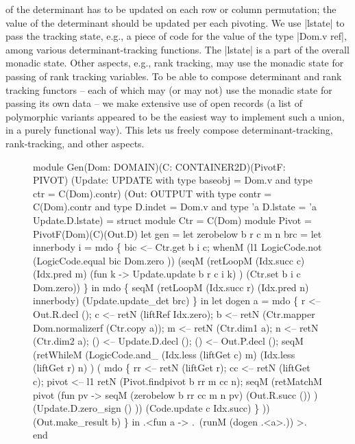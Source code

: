 \documentclass{llncs}
\begin{document}
of the determinant has to be updated on each row or column
permutation; the value of the determinant should be updated per each
pivoting. We use |lstate| to pass the tracking state, e.g., a piece of
code for the value of the type |Dom.v ref|, among
various determinant-tracking functions. The |lstate| is a part of the
overall monadic state. Other aspects, e.g., rank tracking, may use the
monadic state for passing of rank tracking variables. To be able to
compose determinant and rank tracking functors -- each of which may
(or may not) use the monadic state for passing its own data -- we make
extensive use of open records (a list of polymorphic variants
appeared to be the easiest way to implement such a union, in a purely
functional way). This lets us freely compose determinant-tracking,
rank-tracking, and other aspects.

\begin{figure}
\begin{code2}
module Gen(Dom: DOMAIN)(C: CONTAINER2D)(PivotF: PIVOT)
          (Update: UPDATE with type baseobj = Dom.v and type ctr = C(Dom).contr)
          (Out: OUTPUT with type contr = C(Dom).contr and type D.indet = Dom.v 
                        and type 'a D.lstate = 'a Update.D.lstate) = struct
    module Ctr = C(Dom)
    module Pivot = PivotF(Dom)(C)(Out.D)
    let gen =
      let zerobelow b r c m n brc =
        let innerbody i = mdo \{
            bic <-- Ctr.get b i c;
            whenM (l1 LogicCode.not (LogicCode.equal bic Dom.zero ))
                (seqM (retLoopM (Idx.succ c) (Idx.pred m)
                          (fun k -> Update.update b r c i k) )
                      (Ctr.set b i c Dom.zero)) \} in 
        mdo \{
              seqM (retLoopM (Idx.succ r) (Idx.pred n) innerbody) 
                   (Update.update_det brc) \} in
      let dogen a = mdo \{
          r <-- Out.R.decl ();
          c <-- retN (liftRef Idx.zero);
          b <-- retN (Ctr.mapper Dom.normalizerf (Ctr.copy a));
          m <-- retN (Ctr.dim1 a);
          n <-- retN (Ctr.dim2 a);
          () <-- Update.D.decl ();
          () <-- Out.P.decl ();
          seqM 
            (retWhileM (LogicCode.and_ (Idx.less (liftGet c) m)
                                       (Idx.less (liftGet r) n) )
               ( mdo \{
               rr <-- retN (liftGet r);
               cc <-- retN (liftGet c);
               pivot <-- l1 retN (Pivot.findpivot b rr m cc n);
               seqM (retMatchM pivot (fun pv -> 
                        seqM (zerobelow b rr cc m n pv)
                             (Out.R.succ ()) )
                        (Update.D.zero_sign () ))
                    (Code.update c Idx.succ) \} ))
            (Out.make_result b) \} in
    .<fun a -> .~(runM (dogen .<a>.)) >.
end
\end{code2}
\end{figure}
\end{document}
